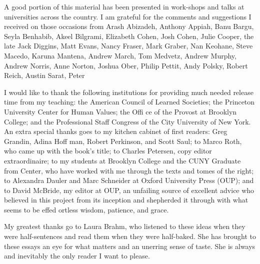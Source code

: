 \par 
A good portion of this material has been presented in work-shops and talks at universities across the country. I am grateful for the comments and suggestions I received on those occasions from Arash Abizadeh, Anthony Appiah, Banu Bargu, Seyla Benhabib, Akeel Bilgrami, Elizabeth Cohen, Josh Cohen, Julie Cooper, the late Jack Diggins, Matt Evans, Nancy Fraser, Mark Graber, Nan Keohane, Steve Macedo, Karuna Mantena, Andrew March, Tom Medvetz, Andrew Murphy, Andrew Norris, Anne Norton, Joshua Ober, Philip Pettit, Andy Polsky, Robert Reich, Austin Sarat, Peter
 \par 
I would like to thank the following institutions for providing much needed release time from my teaching: the American Council of Learned Societies; the Princeton University Center for Human Values; the Offi ce of the Provost at Brooklyn College; and the Professional Staff Congress of the City University of New York. An extra special thanks goes to my kitchen cabinet of first readers: Greg Grandin, Adina Hoff man, Robert Perkinson, and Scott Saul; to Marco Roth, who came up with the book’s title; to Charles Petersen, copy editor extraordinaire; to my students at Brooklyn College and the CUNY Graduate from Center, who have worked with me through the texts and tomes of the right; to Alexandra Dauler and Marc Schneider at Oxford University Press (OUP); and to David McBride, my editor at OUP, an unfailing source of excellent advice who believed in this project from its inception and shepherded it through with what seems to be effed ortless wisdom, patience, and grace.
 \par 
My greatest thanks go to Laura Brahm, who listened to these ideas when they were half-sentences and read them when they were half-baked. She has brought to these essays an eye for what matters and an unerring sense of taste. She is always and inevitably the only reader I want to please.